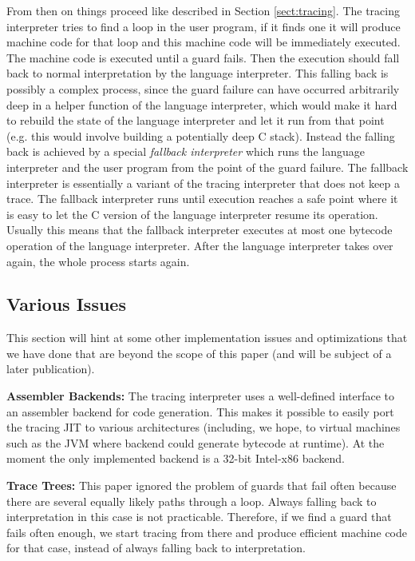 \documentclass{acm_proc_article-sp}
\begin{document}
From then on things proceed like described in Section \ref{sect:tracing}. The
tracing interpreter tries to find a loop in the user program, if it finds one it
will produce machine code for that loop and this machine code will be
immediately executed. The machine code is executed until a guard fails. Then the
execution should fall back to normal interpretation by the language interpreter.
This falling back is possibly a complex process, since the guard failure can
have occurred arbitrarily deep in a helper function of the language interpreter,
which would make it hard to rebuild the state of the language interpreter and
let it run from that point (e.g. this would involve building a potentially deep
C stack). Instead the falling back is achieved by a special \emph{fallback
interpreter} which runs the language interpreter and the user program from the
point of the guard failure. The fallback interpreter is essentially a variant of
the tracing interpreter that does not keep a trace. The fallback interpreter
runs until execution reaches a safe point where it is easy to let the C version
of the language interpreter resume its operation. Usually this means that the
fallback interpreter executes at most one bytecode operation of the language
interpreter. After the language interpreter takes over again, the whole process
starts again.

\subsection{Various Issues}

This section will hint at some other implementation issues and optimizations
that we have done that are beyond the scope of this paper (and will be subject
of a later publication).

\textbf{Assembler Backends:} The tracing interpreter uses a well-defined
interface to an assembler backend for code generation. This makes it possible to
easily port the tracing JIT to various architectures (including, we hope, to
virtual machines such as the JVM where backend could generate bytecode at
runtime). At the moment the only implemented backend is a 32-bit
Intel-x86 backend.

\textbf{Trace Trees:} This paper ignored the problem of guards that fail often
because there are several equally likely paths through
a loop. Always falling back to interpretation in this case is not practicable.
Therefore, if we find a guard that fails often enough, we start tracing from
there and produce efficient machine code for that case, instead of always
falling back to interpretation.
\end{document}
